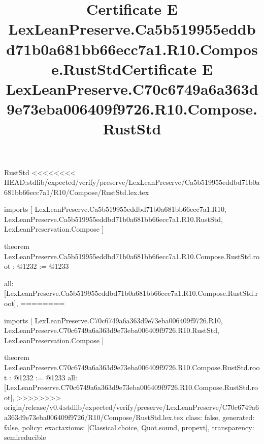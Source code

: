 \begin{lexlean}{RustStd}
<<<<<<<< HEAD:stdlib/expected/verify/preserve/LexLeanPreserve/Ca5b519955eddbd71b0a681bb66ecc7a1/R10/Compose/RustStd.lex.tex
\title{Certificate E LexLeanPreserve.Ca5b519955eddbd71b0a681bb66ecc7a1.R10.Compose.RustStd}
\begin{coremodule}
imports [
  LexLeanPreserve.Ca5b519955eddbd71b0a681bb66ecc7a1.R10,
  LexLeanPreserve.Ca5b519955eddbd71b0a681bb66ecc7a1.R10.RustStd,
  LexLeanPreservation.Compose
]

theorem LexLeanPreserve.Ca5b519955eddbd71b0a681bb66ecc7a1.R10.Compose.RustStd.root : @1232 := @1233 {
  all: [LexLeanPreserve.Ca5b519955eddbd71b0a681bb66ecc7a1.R10.Compose.RustStd.root],
========
\title{Certificate E LexLeanPreserve.C70c6749a6a363d9e73eba006409f9726.R10.Compose.RustStd}
\begin{coremodule}
imports [
  LexLeanPreserve.C70c6749a6a363d9e73eba006409f9726.R10,
  LexLeanPreserve.C70c6749a6a363d9e73eba006409f9726.R10.RustStd,
  LexLeanPreservation.Compose
]

theorem LexLeanPreserve.C70c6749a6a363d9e73eba006409f9726.R10.Compose.RustStd.root : @1232 := @1233 {
  all: [LexLeanPreserve.C70c6749a6a363d9e73eba006409f9726.R10.Compose.RustStd.root],
>>>>>>>> origin/release/v0.4:stdlib/expected/verify/preserve/LexLeanPreserve/C70c6749a6a363d9e73eba006409f9726/R10/Compose/RustStd.lex.tex
  class: false,
  generated: false,
  policy: exact{axioms: [Classical.choice, Quot.sound, propext]},
  transparency: semireducible
}


\end{coremodule}}
\end{coremodule}
\end{lexlean}
